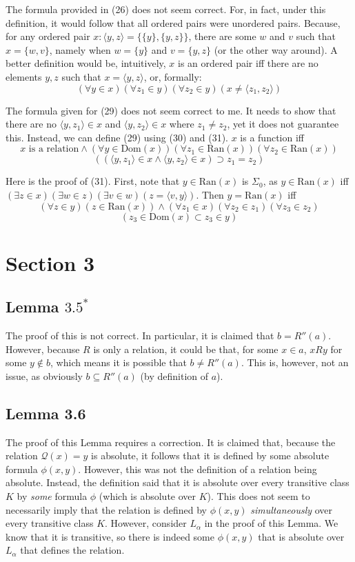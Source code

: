 \documentclass{article}
\theoremstyle{definition}
\begin{document}
The formula provided in (26) does not seem correct. For, in fact, under this definition, it would follow that all ordered pairs were 
unordered pairs. Because, for any ordered pair $x:\langle y,z\rangle=\{\{y\},\{y,z\}\}$, there are some 
$w$ and $v$ such that $x=\{w,v\}$, namely when $w=\{y\}$ and $v=\{y,z\}$ (or the other way around). A better definition would be, intuitively, 
$x$ is an ordered pair iff there are no elements $y,z$ such that $x=\langle y,z\rangle$, or, formally:
\[ (\forall y\in x)(\forall z_1\in y)(\forall z_2\in y)(x\ne\langle z_1,z_2\rangle) \]

The formula given for (29) does not seem correct to me. It needs to show that there are no 
$\langle y,z_1\rangle\in x$ and $\langle y,z_2\rangle\in x$ where $z_1\ne z_2$, yet it does not guarantee this. Instead, we 
can define (29) using (30) and (31). $x$ is a function iff
\[ \textrm{$x$ is a relation}\wedge(\forall y\in\textrm{Dom}(x))(\forall z_1\in\textrm{Ran}(x))(\forall z_2\in\textrm{Ran}(x)) \]
\[ ((\langle y,z_1\rangle\in x\wedge\langle y,z_2\rangle\in x)\supset z_1=z_2) \] 

Here is the proof of (31). First, note that $y\in\textrm{Ran}(x)$ is $\Sigma_0$, as 
$y\in\textrm{Ran}(x)$ iff $(\exists z\in x)(\exists w\in z)(\exists v\in w)(z=\langle v,y\rangle)$. Then 
$y=\textrm{Ran}(x)$ iff
\[ (\forall z\in y)(z\in\textrm{Ran}(x))\wedge(\forall z_1\in x)(\forall z_2\in z_1)(\forall z_3\in z_2) \]
\[ (z_3\in\textrm{Dom}(x)\subset z_3\in y) \]

\section*{Section 3}

\subsection*{Lemma $3.5^*$}
The proof of this is not correct. In particular, it is claimed that $b=R''(a)$. However, because $R$ is only a relation, it 
could be that, for some $x\in a$, $xRy$ for some $y\notin b$, which means it is possible that $b\ne R''(a)$. This is, however, not 
an issue, as obviously $b\subseteq R''(a)$ (by definition of $a$).

\subsection*{Lemma 3.6}
The proof of this Lemma requires a correction. It is claimed that, because the relation $\mathcal{Q}(x)=y$ is absolute, it follows that 
it is defined by some absolute formula $\phi(x,y)$. However, this was not the definition of a relation being absolute. Instead, 
the definition said that it is absolute over every transitive class $K$ by \textit{some} formula $\phi$ (which is absolute over $K$). 
This does not seem to necessarily imply 
that the relation is defined by $\phi(x,y)$ \textit{simultaneously} over every transitive class $K$. However, consider $L_\alpha$ in the proof of this 
Lemma. We know that it is transitive, so there is indeed some $\phi(x,y)$ that is absolute over $L_\alpha$ that defines the relation.
\end{document}
